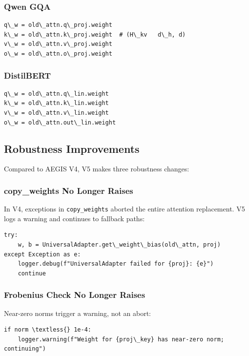 \subsubsection{Qwen GQA}

\begin{lstlisting}
q\_w = old\_attn.q\_proj.weight
k\_w = old\_attn.k\_proj.weight  # (H\_kv   d\_h, d)
v\_w = old\_attn.v\_proj.weight
o\_w = old\_attn.o\_proj.weight
\end{lstlisting}

\subsubsection{DistilBERT}

\begin{lstlisting}
q\_w = old\_attn.q\_lin.weight
k\_w = old\_attn.k\_lin.weight
v\_w = old\_attn.v\_lin.weight
o\_w = old\_attn.out\_lin.weight
\end{lstlisting}

\subsection{Robustness Improvements}

Compared to AEGIS V4, V5 makes three robustness changes:

\subsubsection{copy\_weights No Longer Raises}

In V4, exceptions in \texttt{copy\_weights} aborted the entire attention replacement. 
V5 logs a warning and continues to fallback paths:

\begin{lstlisting}
try:
    w, b = UniversalAdapter.get\_weight\_bias(old\_attn, proj)
except Exception as e:
    logger.debug(f"UniversalAdapter failed for {proj}: {e}")
    continue
\end{lstlisting}

\subsubsection{Frobenius Check No Longer Raises}

Near-zero norms trigger a warning, not an abort:

\begin{lstlisting}
if norm \textless{} 1e-4:
    logger.warning(f"Weight for {proj\_key} has near-zero norm; continuing")
\end{lstlisting}

